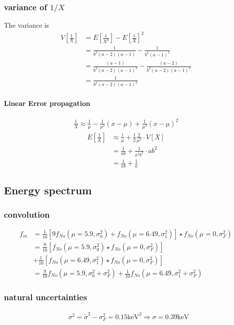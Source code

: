\subsubsection{variance of $1/X$}
The variance is
\begin{align}
    V\left[\frac{1}{X}\right]&=E\left[\frac{1}{X^2}\right]-E\left[\frac{1}{X}\right]^2
    \\&=\frac{1}{b^2\left(a-2\right)\left(a-1\right)}-\frac{1}{b^2\left(a-1\right)^2}
    \\&=\frac{\left(a-1\right)}{b^2\left(a-2\right)\left(a-1\right)^2}-\frac{\left(a-2\right)}{b^2\left(a-2\right)\left(a-1\right)^2}
    \\&=\frac{1}{b^2\left(a-2\right)\left(a-1\right)^2}
\end{align}
\paragraph{Linear Error propagation}
\begin{align}
    \frac{1}{X}\approx\frac{1}{\mu}-\frac{1}{\mu^2}\left(x-\mu\right)+\frac{1}{\mu^3}\left(x-\mu\right)^2
\end{align}
\begin{align}
    E\left[\frac{1}{X}\right]&\approx \frac{1}{\mu}+\frac{1}{2}\frac{2}{\mu^2}\cdot V\left[X\right]
    \\&=\frac{1}{ab}+\frac{1}{a^2b^2}\cdot ab^2
    \\&=\frac{1}{ab}+\frac{1}{a}
\end{align}
\subsection{Energy spectrum}
\subsubsection{convolution}
\begin{align}
    f_m&=\frac{1}{10}\left[9f_{No}\left(\mu=5.9,\sigma_0^2\right)+f_{No}\left(\mu = 6.49,\sigma_1^2\right)\right]\star f_{No}\left(\mu = 0, \sigma_F^2\right)
    \\&=\frac{9}{10}\left[f_{No}\left(\mu=5.9,\sigma_0^2\right)\star f_{No}\left(\mu = 0, \sigma_F^2\right)\right]
    \\&+\frac{1}{10}\left[f_{No}\left(\mu=6.49,\sigma_1^2\right)\star f_{No}\left(\mu = 0, \sigma_F^2\right)\right]
    \\&=\frac{9}{10}f_{No}\left(\mu=5.9,\sigma_0^2+\sigma_F^2\right)+\frac{1}{10}f_{No}\left(\mu=6.49,\sigma_1^2+\sigma_F^2\right)
\end{align}
\subsubsection{natural uncertainties}
\begin{align}
    &\sigma^2 = \tilde{\sigma}^2-\sigma_F^2 = 0.15 \text{keV}^2 \Rightarrow \sigma = 0.39 \text{keV}
\end{align}
